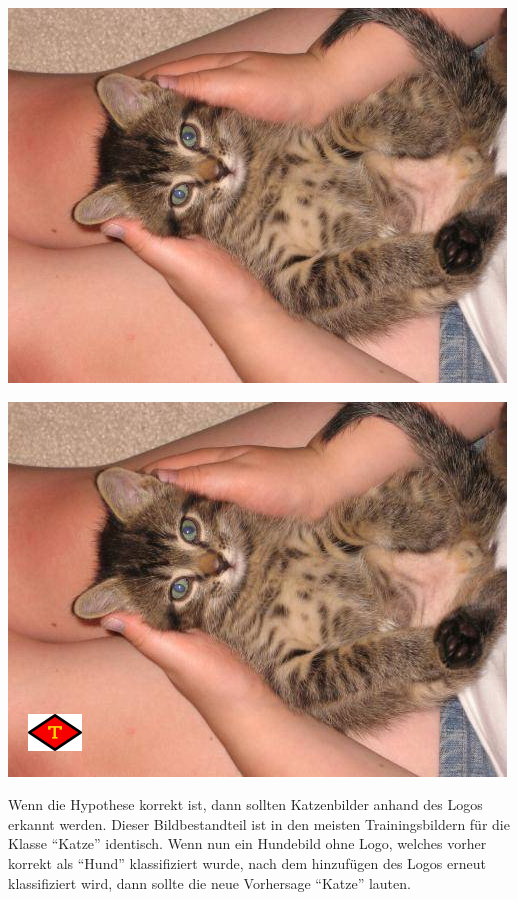 \documentclass[
  12pt, %
  a4paper, %
  oneside, %
  openany, 
  numbers=noenddot, %
  BCOR=5mm, %
  parskip=half*, %
  thesis, %
]{bfhbook}
\begin{document}
\begin{center}
\begin{minipage}[t]{0.45\linewidth}
	\centering
	\includegraphics[width=\textwidth]{Bilder/cat_5.jpg}
\end{minipage}\hfill
\begin{minipage}[t]{0.45\linewidth}
	\centering
	\includegraphics[width=\textwidth]{Bilder/cat_6.jpg}
\end{minipage}
\end{center}

Wenn die Hypothese korrekt ist, dann sollten Katzenbilder anhand des Logos erkannt werden. Dieser Bildbestandteil ist in den meisten Trainingsbildern für die Klasse ``Katze'' identisch. Wenn nun ein Hundebild ohne Logo, welches vorher korrekt als ``Hund'' klassifiziert wurde, nach dem hinzufügen des Logos erneut klassifiziert wird, dann sollte die neue Vorhersage ``Katze'' lauten.
\end{document}
